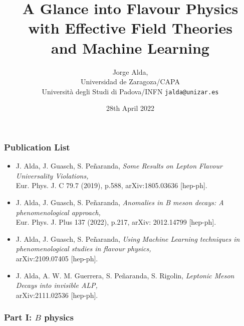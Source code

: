 \documentclass[mathserif, 10pt]{beamer}
\title[A Glance into Flavour Physics...]{A Glance into Flavour Physics \\with Effective Field Theories\\ and Machine Learning}
\author[Jorge Alda]{Jorge Alda,\\ Universidad de Zaragoza/CAPA\\
Università degli Studi di Padova/INFN \hspace{2em} \texttt{jalda@unizar.es} }
\date[PhD Thesis]{28th April 2022}
\begin{document}
\begin{frame}

\titlepage

\end{frame}

\begin{frame}\frametitle{Publication List}

    \begin{itemize}
        \item J. Alda, J. Guasch, S. Peñaranda,
              \textit{Some Results on Lepton Flavour Universality Violations,}\\
              Eur. Phys. J. C 79.7 (2019), p.588, arXiv:1805.03636 [hep-ph].
        \item J. Alda, J. Guasch, S. Peñaranda, \textit{Anomalies in B meson decays: A phenomenological approach,}\\
              Eur. Phys. J. Plus 137 (2022), p.217, arXiv: 2012.14799 [hep-ph].
        \item J. Alda, J. Guasch, S. Peñaranda,
              \textit{Using Machine Learning techniques in phenomenological studies in flavour physics,}\\
              arXiv:2109.07405 [hep-ph].
        \item J. Alda, A. W. M. Guerrera, S. Peñaranda, S. Rigolin,
              \textit{Leptonic Meson Decays into invisible ALP,}\\
              arXiv:2111.02536 [hep-ph].
    \end{itemize}

\end{frame}

\begin{frame}\frametitle{Part I: $B$ physics}
\end{frame}
\end{document}
